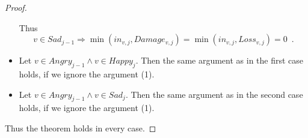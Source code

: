 \documentclass[11pt]{llncs}
\theoremstyle{definition}
\begin{document}
\begin{proof}
\begin{itemize}
          Thus
          \begin{equation*}
             v \in Sad_{j-1} \Rightarrow \min\left(in_{v, j}, Damage_{v,j}\right) = \min\left(in_{v, j}, Loss_{v,j}\right) =
             0 \enspace.
          \end{equation*}
          \item Let $v \in Angry_{j-1} \wedge v \in Happy_j$. Then the same argument as in the first case holds, if
          we ignore the argument (1).
          \item Let $v \in Angry_{j-1} \wedge v \in Sad_j$. Then the same argument as in the second case holds, if 
          we ignore the argument (1).
       \end{itemize}
       Thus the theorem holds in every case.
    \end{proof}
\end{document}
